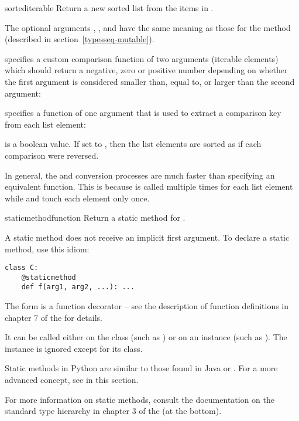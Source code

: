 \begin{funcdesc}{sorted}{iterable}
  Return a new sorted list from the items in .

  The optional arguments , , and  have
  the same meaning as those for the  method
  (described in section~\ref{typesseq-mutable}).

   specifies a custom comparison function of two arguments
  (iterable elements) which should return a negative, zero or positive
  number depending on whether the first argument is considered smaller
  than, equal to, or larger than the second argument:
     
   specifies a function of one argument that is used to
     extract a comparison key from each list element:

   is a boolean value.  If set to , then the
     list elements are sorted as if each comparison were reversed.

  In general, the  and  conversion processes are
  much faster than specifying an equivalent  function.  This is
  because  is called multiple times for each list element while
   and  touch each element only once.

\end{funcdesc}

\begin{funcdesc}{staticmethod}{function}
  Return a static method for .

  A static method does not receive an implicit first argument.
  To declare a static method, use this idiom:

\begin{verbatim}
class C:
    @staticmethod
    def f(arg1, arg2, ...): ...
\end{verbatim}

  The  form is a function decorator -- see the description
  of function definitions in chapter 7 of the
   for details.

  It can be called either on the class (such as ) or on an
  instance (such as ).  The instance is ignored except
  for its class.

  Static methods in Python are similar to those found in Java or \Cpp.
  For a more advanced concept, see  in this
  section.
  
  For more information on static methods, consult the documentation on the
  standard type hierarchy in chapter 3 of the
   (at the bottom).
\end{funcdesc}


